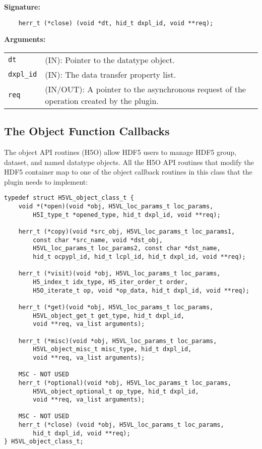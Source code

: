\textbf{Signature:}
\begin{lstlisting}
    herr_t (*close) (void *dt, hid_t dxpl_id, void **req);
\end{lstlisting}

\textbf{Arguments:}\\
\begin{tabular}{l p{10cm}}
  {\tt dt} & (IN): Pointer to the datatype object.\\
  {\tt dxpl\_id} & (IN): The data transfer property list.\\
  {\tt req} & (IN/OUT): A pointer to the asynchronous request of the
  operation created by the plugin.\\
\end{tabular}

\subsection{The Object Function Callbacks}
The object API routines (H5O) allow HDF5 users to manage HDF5 group,
dataset, and named datatype objects. All the H5O API routines that
modify the HDF5 container map to one of the object callback routines
in this class that the plugin needs to implement:

\begin{lstlisting}
typedef struct H5VL_object_class_t {
    void *(*open)(void *obj, H5VL_loc_params_t loc_params, 
        H5I_type_t *opened_type, hid_t dxpl_id, void **req);

    herr_t (*copy)(void *src_obj, H5VL_loc_params_t loc_params1, 
        const char *src_name, void *dst_obj, 
        H5VL_loc_params_t loc_params2, const char *dst_name,
        hid_t ocpypl_id, hid_t lcpl_id, hid_t dxpl_id, void **req);

    herr_t (*visit)(void *obj, H5VL_loc_params_t loc_params, 
        H5_index_t idx_type, H5_iter_order_t order, 
        H5O_iterate_t op, void *op_data, hid_t dxpl_id, void **req);

    herr_t (*get)(void *obj, H5VL_loc_params_t loc_params, 
        H5VL_object_get_t get_type, hid_t dxpl_id, 
        void **req, va_list arguments);

    herr_t (*misc)(void *obj, H5VL_loc_params_t loc_params, 
        H5VL_object_misc_t misc_type, hid_t dxpl_id, 
        void **req, va_list arguments);

    MSC - NOT USED
    herr_t (*optional)(void *obj, H5VL_loc_params_t loc_params, 
        H5VL_object_optional_t op_type, hid_t dxpl_id, 
        void **req, va_list arguments);

    MSC - NOT USED
    herr_t (*close) (void *obj, H5VL_loc_params_t loc_params, 
        hid_t dxpl_id, void **req);
} H5VL_object_class_t;
\end{lstlisting}


